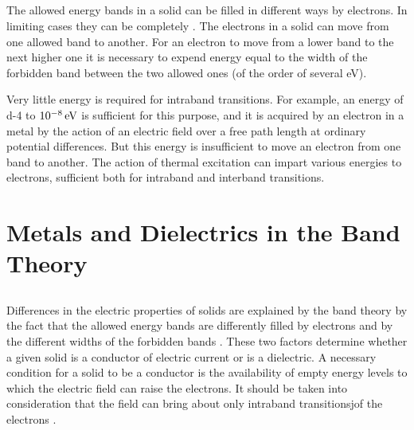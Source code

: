 \subsection{}\label{41.8.6} The allowed energy bands in a solid can be filled in different ways by electrons. In limiting cases they can be completely . The electrons in a solid can move from one allowed band to another. For an electron to move from a lower band to the next higher one it is necessary to expend energy equal to the width of the forbidden band between the two allowed ones (of the order of several eV).

Very little energy is required for intraband transitions. For
example, an energy of \num{d-4} to $\SI{d-8}{\electronvolt}$ is sufficient for this purpose, and it is acquired by an electron in a metal by the action of an electric field over a free path length at ordinary potential differences. But this energy is insufficient to move an  electron from one band to another. The action of thermal excitation can impart various energies to electrons, sufficient both for intraband and interband transitions.


\section{Metals and Dielectrics in the Band Theory}
\label{sec-41.9} 


\subsection{}\label{41.9.1} Differences in the electric properties of solids are explained by the band theory  by the fact that the allowed energy bands  are differently filled by electrons and by
the different widths of the forbidden bands . These two factors determine whether a given solid is a conductor of electric current or is a dielectric. A necessary condition for a solid to be a conductor is the availability of empty energy levels to which the electric field can raise the electrons. It should be taken into consideration that the field can bring about only intraband transitionsjof the electrons .

